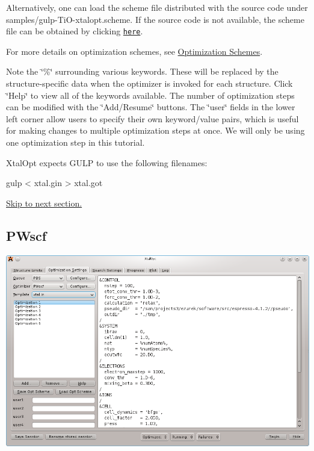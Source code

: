 Alternatively, one can load the scheme file distributed with the source code under samples/gulp-\/\+Ti\+O-\/xtalopt.\+scheme. If the source code is not available, the scheme file can be obtained by clicking \href{http://xtalopt.github.io/samples/gulp-TiO-xtalopt.scheme}{\tt here}.

For more details on optimization schemes, see \hyperlink{optschemes}{Optimization Schemes}.

Note the \char`\"{}\%\char`\"{} surrounding various keywords. These will be replaced by the structure-\/specific data when the optimizer is invoked for each structure. Click \char`\"{}\+Help\char`\"{} to view all of the keywords available. The number of optimization steps can be modified with the \char`\"{}\+Add/\+Resume\char`\"{} buttons. The \char`\"{}user\char`\"{} fields in the lower left corner allow users to specify their own keyword/value pairs, which is useful for making changes to multiple optimization steps at once. We will only be using one optimization step in this tutorial.

Xtal\+Opt expects G\+U\+L\+P to use the following filenames\+:


\begin{DoxyCode}
gulp < xtal.gin > xtal.got
\end{DoxyCode}


\hyperlink{tut-xo_qisetup}{Skip to next section.}\hypertarget{tut-xo_pwscf-opt}{}\subsection{P\+Wscf}\label{tut-xo_pwscf-opt}
 
\begin{DoxyImageNoCaption}
  \mbox{\includegraphics[width=\textwidth]{opt-set-pwscf.png}}
\end{DoxyImageNoCaption}


